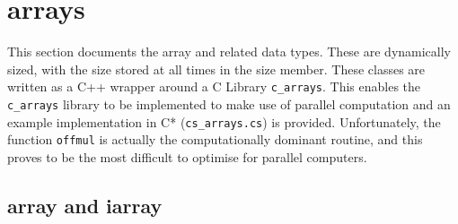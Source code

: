 \section{arrays}

This section documents the array and related data types. These are
dynamically sized, with the size stored at all times in the size
member. These classes are written as a C++ wrapper around a C Library
{\tt c\_arrays}. This enables the {\tt c\_arrays} library to be
implemented to make use of parallel computation and an example
implementation in C* ({\tt cs\_arrays.cs}) is provided. Unfortunately,
the function \verb|offmul| is actually the computationally dominant
routine, and this proves to be the most difficult to optimise for
parallel computers.

\subsection{array and iarray}\label{array}

